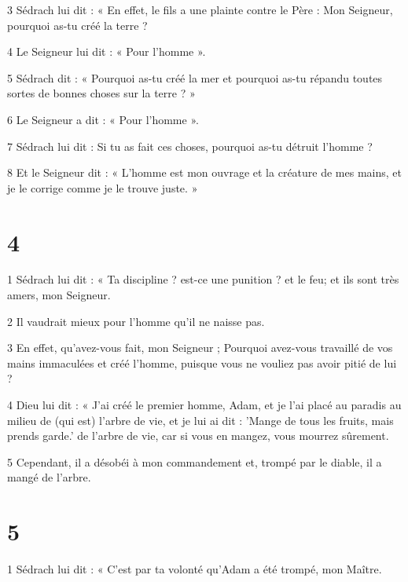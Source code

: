 \par 3 Sédrach lui dit : « En effet, le fils a une plainte contre le Père : Mon Seigneur, pourquoi as-tu créé la terre ?

\par 4 Le Seigneur lui dit : « Pour l'homme ».

\par 5 Sédrach dit : « Pourquoi as-tu créé la mer et pourquoi as-tu répandu toutes sortes de bonnes choses sur la terre ? »

\par 6 Le Seigneur a dit : « Pour l’homme ».

\par 7 Sédrach lui dit : Si tu as fait ces choses, pourquoi as-tu détruit l'homme ?

\par 8 Et le Seigneur dit : « L'homme est mon ouvrage et la créature de mes mains, et je le corrige comme je le trouve juste. »

\chapter{4}

\par 1 Sédrach lui dit : « Ta discipline ? est-ce une punition ? et le feu; et ils sont très amers, mon Seigneur.

\par 2 Il vaudrait mieux pour l'homme qu'il ne naisse pas.

\par 3 En effet, qu'avez-vous fait, mon Seigneur ; Pourquoi avez-vous travaillé de vos mains immaculées et créé l'homme, puisque vous ne vouliez pas avoir pitié de lui ?

\par 4 Dieu lui dit : « J'ai créé le premier homme, Adam, et je l'ai placé au paradis au milieu de (qui est) l'arbre de vie, et je lui ai dit : 'Mange de tous les fruits, mais prends garde.' de l'arbre de vie, car si vous en mangez, vous mourrez sûrement.

\par 5 Cependant, il a désobéi à mon commandement et, trompé par le diable, il a mangé de l'arbre.

\chapter{5}

\par 1 Sédrach lui dit : « C'est par ta volonté qu'Adam a été trompé, mon Maître.

